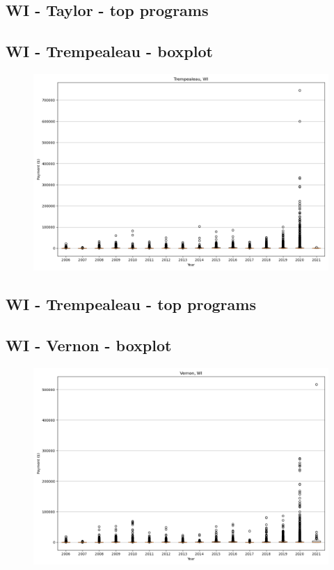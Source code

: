 \subsection*{WI - Taylor - top programs}

\newpage
\subsection*{WI - Trempealeau - boxplot}
\begin{figure}[h]
\centering
\includegraphics[width=7in]{../output/boxplots/counties/Trempealeau-WI_boxplot.png}
\end{figure}


\subsection*{WI - Trempealeau - top programs}

\newpage
\subsection*{WI - Vernon - boxplot}
\begin{figure}[h]
\centering
\includegraphics[width=7in]{../output/boxplots/counties/Vernon-WI_boxplot.png}
\end{figure}


